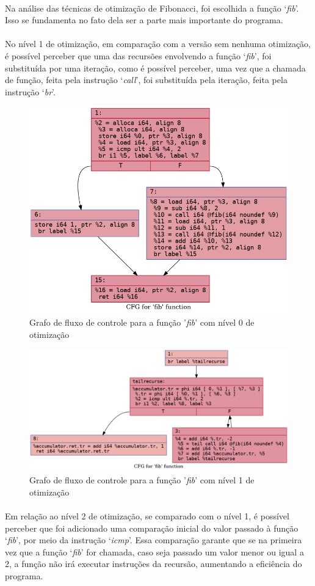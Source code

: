 \documentclass[12pt]{article}
\begin{document}
\paragraph{}Na análise das técnicas de otimização de Fibonacci, foi escolhida a função ‘\textit{fib}’. Isso se fundamenta no fato dela ser a parte mais importante do programa.

\paragraph{}No nível 1 de otimização, em comparação com a versão sem nenhuma otimização, é possível perceber que uma das recursões envolvendo a função ‘\textit{fib}’, foi substituída por uma iteração, como é possível perceber, uma vez que a chamada de função, feita pela instrução ‘\textit{call}’, foi substituída pela iteração, feita pela instrução ‘\textit{br}’.

\begin{figure}
    \centering
    \includegraphics[width=0.5\linewidth]{fib2_.fib_O0.png}
    \caption{Grafo de fluxo de controle para a função '\textit{fib}' com nível 0 de otimização}
\end{figure}

\begin{figure}
    \centering
    \includegraphics[width=0.5\linewidth]{fib2_.fib_O1.png}
    \caption{Grafo de fluxo de controle para a função '\textit{fib}' com nível 1 de otimização}
\end{figure}

\paragraph{}Em relação ao nível 2 de otimização, se comparado com o nível 1, é possível perceber que foi adicionado uma comparação inicial do valor passado à função ‘\textit{fib}’, por meio da instrução ‘\textit{icmp}’. Essa comparação garante que se na primeira vez que a função ‘\textit{fib}’ for chamada, caso seja passado um valor menor ou igual a 2, a função não irá executar instruções da recursão, aumentando a eficiência do programa.
\end{document}
